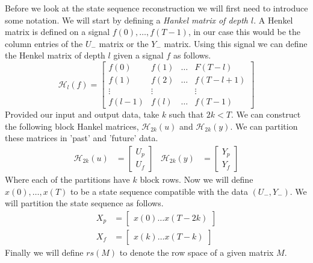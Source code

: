 Before we look at the state sequence reconstruction we will first need to introduce some notation. We will start by defining a \textit{Hankel matrix of depth $l$}. A Henkel matrix is defined on a signal $f(0), \dots, f(T-1)$, in our case this would be the column entries of the $U_-$ matrix or the $Y_-$ matrix. Using this signal we can define the Henkel matrix of depth $l$ given a signal $f$ as follows.
\begin{equation*}
	\mathcal{H}_l (f) = 
	\begin{bmatrix} 
		f(0) & f(1) & \dots & F(T-l) \\ 
		f(1) & f(2) & \dots & f(T-l+1) \\ 
		\vdots & \vdots & & \vdots \\ 
		f(l-1) & f(l) & \dots & f(T-1)
	\end{bmatrix}
\end{equation*}
Provided our input and output data, take $k$ such that $2k < T$. We can construct the following block Hankel matrices, $\mathcal{H}_{2k}(u)$ and $\mathcal{H}_{2k}(y)$. We can partition these matrices in 'past' and 'future' data.
\begin{align*}
	\mathcal{H}_{2k}(u) &= \begin{bmatrix} U_p \\ U_f \end{bmatrix} & 
	\mathcal{H}_{2k}(y) &= \begin{bmatrix} Y_p \\ Y_f \end{bmatrix}
\end{align*}
Where each of the partitions have $k$ block rows. Now we will define $x(0), \dots, x(T)$ to be a state sequence compatible with the data $(U_-,Y_-)$. We will partition the state sequence as follows.
\begin{align*}
	X_p &= \begin{bmatrix} x(0) \dots x(T-2k) \end{bmatrix} \\
	X_f &= \begin{bmatrix} x(k) \dots x(T-k) \end{bmatrix} 
\end{align*}
Finally we will define $rs(M)$ to denote the row space of a given matrix $M$. 

